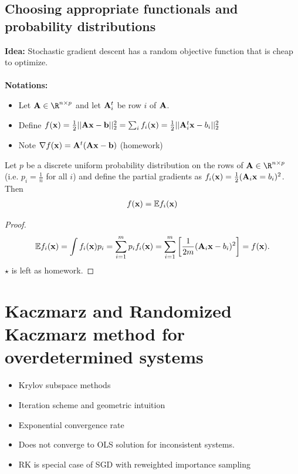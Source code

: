 \documentclass[./some_latex_template.tex]{subfiles}
\begin{document}
\subsection{Choosing appropriate functionals and probability distributions}

\textbf{Idea:} Stochastic gradient descent has a random objective function that is cheap to optimize. \\
\\
\textbf{Notations:}
\begin{itemize}
	\item Let $\bA \in \R^{n \times p}$ and let $\mathbf{A}_i^t$ be row $i$ of $\mathbf{A}$.
	\item Define $f(\mathbf{x}) = \frac{1}{2}||\mathbf{A}\mathbf{x} - \mathbf{b}||_2^2 = \sum_i f_i (\mathbf{x}) = \frac{1}{2}||\mathbf{A}_i^t\mathbf{x} - b_i||_2^2$
	\item Note $\nabla f(\mathbf{x}) = \mathbf{A}^t(\mathbf{A}\mathbf{x} - \mathbf{b})$ (homework)
\end{itemize}

\begin{theorembox}{}{}
Let $p$ be a discrete uniform probability distribution on the rows of $\bA \in \R^{n \times p}$ (i.e. $p_i = \frac{1}{n}$ for all $i$) and define the partial gradients as $f_i(\mathbf{x}) = \frac{1}{2}(\mathbf{A}_i \mathbf{x} = b_i)^2$. Then 
\begin{align*}
	f(\mathbf{x}) = \mathbb{E} f_i(\mathbf{x})
\end{align*}
\end{theorembox}

\begin{proof}
\begin{align*}
	\mathbb{E} f_i(\mathbf{x}) = \int f_i(\mathbf{x}) p_i = \sum_{i=1}^m p_i f_i(\mathbf{x}) = \sum_{i=1}^m \left[ \frac{1}{2m}  (\mathbf{A}_i \mathbf{x} - b_i)^2 \right] =  f(\mathbf{x}).
\end{align*}
$\star$ is left as homework. 
\end{proof}

\section{Kaczmarz and Randomized Kaczmarz method for overdetermined systems}

\begin{itemize}
	\item Krylov subspace methods
	\item Iteration scheme and geometric intuition
	\item Exponential convergence rate
	\item Does not converge to OLS solution for inconsistent systems.
	\item RK is special case of SGD with reweighted importance sampling
\end{itemize}
\end{document}
